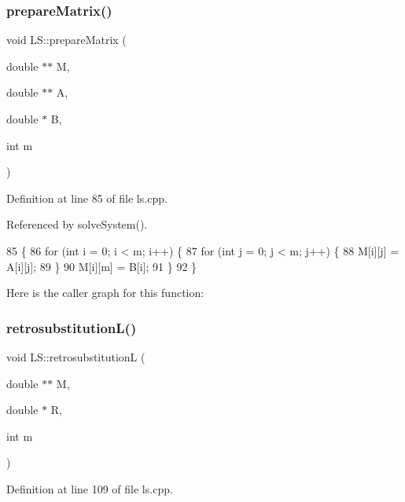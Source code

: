\subsubsection{\texorpdfstring{prepare\+Matrix()}{prepareMatrix()}}
{\footnotesize\ttfamily void L\+S\+::prepare\+Matrix (\begin{DoxyParamCaption}\item[{double $\ast$$\ast$}]{M,  }\item[{double $\ast$$\ast$}]{A,  }\item[{double $\ast$}]{B,  }\item[{int}]{m }\end{DoxyParamCaption})\hspace{0.3cm}{\ttfamily [private]}}



Definition at line 85 of file ls.\+cpp.



Referenced by solve\+System().


\begin{DoxyCode}
85                                                                 \{
86     \textcolor{keywordflow}{for} (\textcolor{keywordtype}{int} i = 0; i < m; i++) \{
87         \textcolor{keywordflow}{for} (\textcolor{keywordtype}{int} j = 0; j < m; j++) \{
88             M[i][j] = A[i][j];
89         \}
90         M[i][m] = B[i];
91     \}
92 \}
\end{DoxyCode}
Here is the caller graph for this function\+:
\mbox{\label{class_l_s_ada47f10ff595a886a79bb0f4eacbe7d7}} 
\subsubsection{\texorpdfstring{retrosubstitution\+L()}{retrosubstitutionL()}}
{\footnotesize\ttfamily void L\+S\+::retrosubstitutionL (\begin{DoxyParamCaption}\item[{double $\ast$$\ast$}]{M,  }\item[{double $\ast$}]{R,  }\item[{int}]{m }\end{DoxyParamCaption})\hspace{0.3cm}{\ttfamily [private]}}



Definition at line 109 of file ls.\+cpp.



